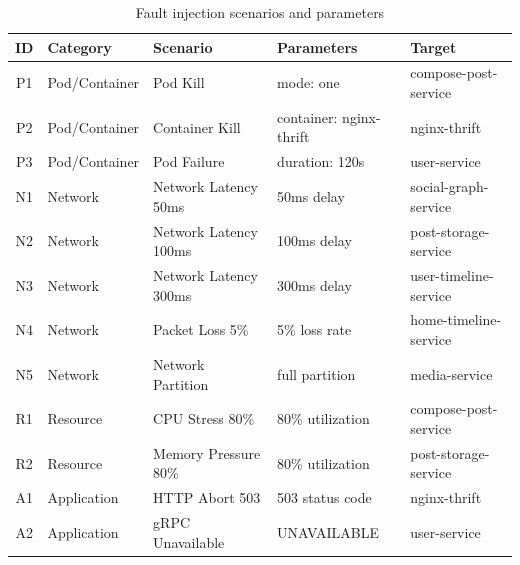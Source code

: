 \begin{table}[ht]
\centering
\caption{Fault injection scenarios and parameters}
\label{tab:scenarios}
\small
\begin{tabular}{cllll}
\hline
\textbf{ID} & \textbf{Category} & \textbf{Scenario} & \textbf{Parameters} & \textbf{Target} \\
\hline
P1 & Pod/Container & Pod Kill & mode: one & compose-post-service \\
P2 & Pod/Container & Container Kill & container: nginx-thrift & nginx-thrift \\
P3 & Pod/Container & Pod Failure & duration: 120s & user-service \\
N1 & Network & Network Latency 50ms & 50ms delay & social-graph-service \\
N2 & Network & Network Latency 100ms & 100ms delay & post-storage-service \\
N3 & Network & Network Latency 300ms & 300ms delay & user-timeline-service \\
N4 & Network & Packet Loss 5\% & 5\% loss rate & home-timeline-service \\
N5 & Network & Network Partition & full partition & media-service \\
R1 & Resource & CPU Stress 80\% & 80\% utilization & compose-post-service \\
R2 & Resource & Memory Pressure 80\% & 80\% utilization & post-storage-service \\
A1 & Application & HTTP Abort 503 & 503 status code & nginx-thrift \\
A2 & Application & gRPC Unavailable & UNAVAILABLE & user-service \\
\hline
\end{tabular}
\end{table}